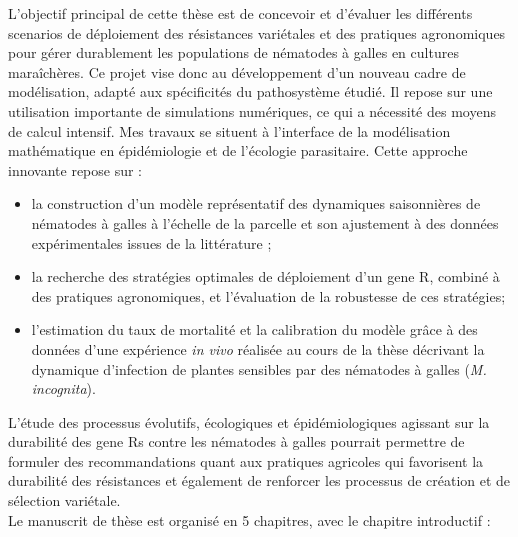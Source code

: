 	L'objectif principal de cette thèse est de concevoir et d'évaluer les différents scenarios de déploiement
des résistances variétales et des pratiques agronomiques pour gérer durablement les populations de
nématodes à galles en cultures maraîchères. %
Ce projet vise donc  au développement d’un nouveau cadre de modélisation, adapté aux spécificités du pathosystème étudié.  Il repose sur une utilisation importante de simulations numériques, ce qui a nécessité
des moyens de calcul intensif. Mes travaux se situent à l’interface de la modélisation mathématique  en épidémiologie et de l’écologie parasitaire.  Cette approche innovante repose sur : 
\begin{itemize}
\item  la construction d'un modèle représentatif des dynamiques saisonnières de nématodes à galles
à l'échelle de la parcelle et son ajustement à des données expérimentales issues de la littérature \citep{Ehwaeti1998};
\item  la recherche des stratégies optimales de déploiement d'un \gls{gene R}, combiné à des
pratiques agronomiques, et l'évaluation de la robustesse de ces stratégies;
\item l'estimation du taux de mortalité et la calibration du modèle grâce à des données d'une expérience \textit{in vivo} réalisée au cours de la thèse décrivant la dynamique d'infection de plantes sensibles par des nématodes à galles (\textit{M. incognita}).
\end{itemize}
L'étude des processus évolutifs, écologiques et épidémiologiques agissant sur
la durabilité des \glspl{gene R}  contre les nématodes à galles pourrait permettre de formuler  des recommandations  quant aux
pratiques agricoles qui favorisent la durabilité des résistances et  également de renforcer les processus de création et de sélection variétale. \\

Le manuscrit de thèse est organisé en 5 chapitres, avec le chapitre introductif :\\

